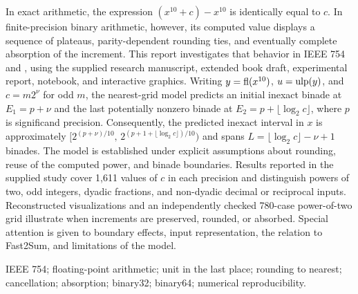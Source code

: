 \begin{Abstract}
In exact arithmetic, the expression $(x^{10}+c)-x^{10}$ is identically equal to $c$. In finite-precision binary arithmetic, however, its computed value displays a sequence of plateaus, parity-dependent rounding ties, and eventually complete absorption of the increment. This report investigates that behavior in IEEE 754  and , using the supplied research manuscript, extended book draft, experimental report, notebook, and interactive graphics. Writing $y=\operatorname{fl}(x^{10})$, $u=\operatorname{ulp}(y)$, and $c=m2^{\nu}$ for odd $m$, the nearest-grid model predicts an initial inexact binade at $E_1=p+\nu$ and the last potentially nonzero binade at $E_2=p+\lfloor\log_2 c\rfloor$, where $p$ is significand precision. Consequently, the predicted inexact interval in $x$ is approximately $[2^{(p+\nu)/10},\,2^{(p+1+\lfloor\log_2 c\rfloor)/10})$ and spans $L=\lfloor\log_2 c\rfloor-\nu+1$ binades. The model is established under explicit assumptions about rounding, reuse of the computed power, and binade boundaries. Results reported in the supplied study cover 1,611 values of $c$ in each precision and distinguish powers of two, odd integers, dyadic fractions, and non-dyadic decimal or reciprocal inputs. Reconstructed visualizations and an independently checked 780-case power-of-two grid illustrate when increments are preserved, rounded, or absorbed. Special attention is given to boundary effects, input representation, the relation to Fast2Sum, and limitations of the model.

\Keywords IEEE 754; floating-point arithmetic; unit in the last place; rounding to nearest; cancellation; absorption; binary32; binary64; numerical reproducibility.
\end{Abstract}

\tableofcontents
\listoffigures
\listoftables
